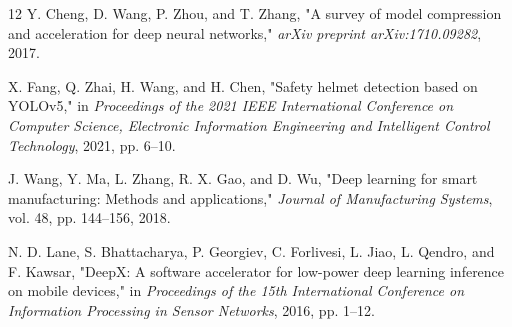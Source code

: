 \documentclass[journal]{IEEEtran}
\begin{document}
\begin{thebibliography}{12}
Y. Cheng, D. Wang, P. Zhou, and T. Zhang, "A survey of model compression and acceleration for deep neural networks," \textit{arXiv preprint arXiv:1710.09282}, 2017.

X. Fang, Q. Zhai, H. Wang, and H. Chen, "Safety helmet detection based on YOLOv5," in \textit{Proceedings of the 2021 IEEE International Conference on Computer Science, Electronic Information Engineering and Intelligent Control Technology}, 2021, pp. 6--10.

J. Wang, Y. Ma, L. Zhang, R. X. Gao, and D. Wu, "Deep learning for smart manufacturing: Methods and applications," \textit{Journal of Manufacturing Systems}, vol. 48, pp. 144--156, 2018.

N. D. Lane, S. Bhattacharya, P. Georgiev, C. Forlivesi, L. Jiao, L. Qendro, and F. Kawsar, "DeepX: A software accelerator for low-power deep learning inference on mobile devices," in \textit{Proceedings of the 15th International Conference on Information Processing in Sensor Networks}, 2016, pp. 1--12.
\end{thebibliography}
\end{document}
